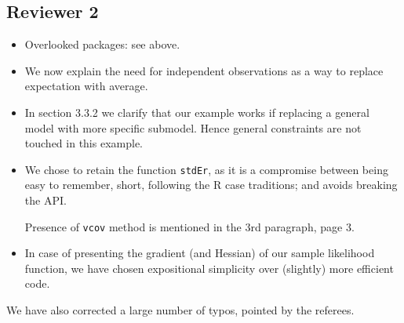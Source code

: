 \documentclass[12pt,parskip=half]{scrartcl}
\begin{document}
\subsection*{Reviewer 2}

\begin{itemize}
\item Overlooked packages: see above.
\item We now explain the need for independent observations as a way to
  replace expectation with average.
\item In section 3.3.2 we clarify that our example works if replacing
  a general model with more specific submodel.  Hence general
  constraints are not touched in this example.
\item We chose to retain the function \texttt{stdEr}, as it is a
  compromise between being easy to remember, short, following the R
  case traditions; and avoids breaking the API.

  Presence of \texttt{vcov} method is mentioned in the 3rd paragraph,
  page 3.
\item In case of presenting the gradient (and Hessian) of our sample
  likelihood function, we have chosen expositional simplicity over
  (slightly) more efficient code.
\end{itemize}

We have also corrected a large number of typos, pointed by the referees.



\end{document}
